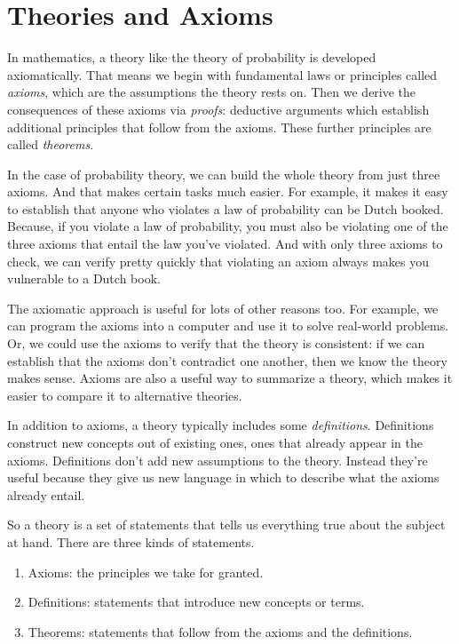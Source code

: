 \documentclass[justified]{tufte-book}
\providecommand{\tightlist}{%
  \setlength{\itemsep}{0pt}\setlength{\parskip}{0pt}}
\theoremstyle{definition}
\theoremstyle{definition}
\theoremstyle{definition}
\theoremstyle{definition}
\theoremstyle{remark}
\begin{document}
\hypertarget{theories-and-axioms}{%
\section*{Theories and Axioms}\label{theories-and-axioms}}

In mathematics, a theory like the theory of probability is developed axiomatically. That means we begin with fundamental laws or principles called \emph{axioms}, which are the assumptions the theory rests on. Then we derive the consequences of these axioms via \emph{proofs}: deductive arguments which establish additional principles that follow from the axioms. These further principles are called \emph{theorems}.

In the case of probability theory, we can build the whole theory from just three axioms. And that makes certain tasks much easier. For example, it makes it easy to establish that anyone who violates a law of probability can be Dutch booked. Because, if you violate a law of probability, you must also be violating one of the three axioms that entail the law you've violated. And with only three axioms to check, we can verify pretty quickly that violating an axiom always makes you vulnerable to a Dutch book.

The axiomatic approach is useful for lots of other reasons too. For example, we can program the axioms into a computer and use it to solve real-world problems. Or, we could use the axioms to verify that the theory is consistent: if we can establish that the axioms don't contradict one another, then we know the theory makes sense. Axioms are also a useful way to summarize a theory, which makes it easier to compare it to alternative theories.

In addition to axioms, a theory typically includes some \emph{definitions}. Definitions construct new concepts out of existing ones, ones that already appear in the axioms. Definitions don't add new assumptions to the theory. Instead they're useful because they give us new language in which to describe what the axioms already entail.

So a theory is a set of statements that tells us everything true about the subject at hand. There are three kinds of statements.

\begin{enumerate}
\def\labelenumi{\arabic{enumi}.}
\tightlist
\item
  Axioms: the principles we take for granted.
\item
  Definitions: statements that introduce new concepts or terms.
\item
  Theorems: statements that follow from the axioms and the definitions.
\end{enumerate}
\end{document}
